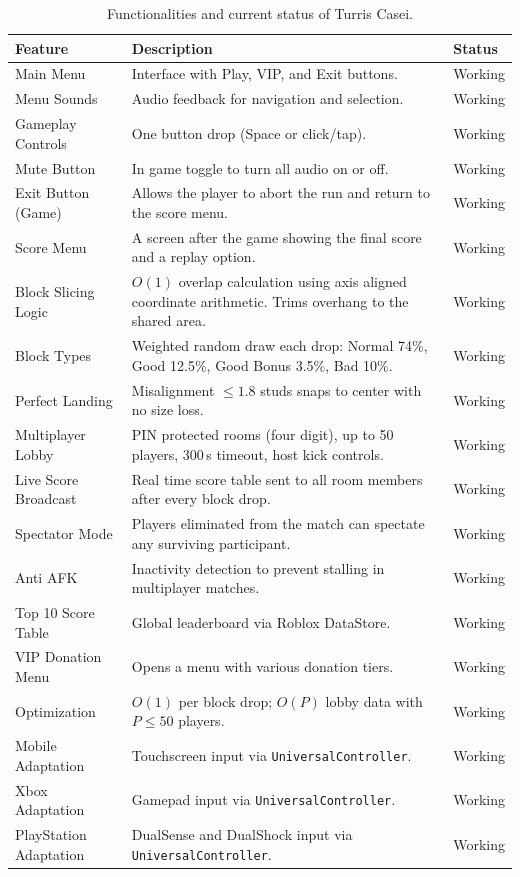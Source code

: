 \documentclass[12pt,letterpaper]{article}
\begin{document}
\begin{table}[H]
\centering
\begin{tabular}{|p{4cm}|p{8cm}|p{2.5cm}|}
\hline
\textbf{Feature} & \textbf{Description} & \textbf{Status} \\
\hline
Main Menu & Interface with Play, VIP, and Exit buttons. & Working \\
\hline
Menu Sounds & Audio feedback for navigation and selection. & Working \\
\hline
Gameplay Controls & One button drop (Space or click/tap). & Working \\
\hline
Mute Button & In game toggle to turn all audio on or off. & Working \\
\hline
Exit Button (Game) & Allows the player to abort the run and return to the score menu. & Working \\
\hline
Score Menu & A screen after the game showing the final score and a replay option. & Working \\
\hline
Block Slicing Logic & $O(1)$ overlap calculation using axis aligned coordinate arithmetic. Trims overhang to the shared area. & Working \\
\hline
Block Types & Weighted random draw each drop: Normal 74\%, Good 12.5\%, Good Bonus 3.5\%, Bad 10\%. & Working \\
\hline
Perfect Landing & Misalignment $\leq 1.8$ studs snaps to center with no size loss. & Working \\
\hline
Multiplayer Lobby & PIN protected rooms (four digit), up to 50 players, 300\,s timeout, host kick controls. & Working \\
\hline
Live Score Broadcast & Real time score table sent to all room members after every block drop. & Working \\
\hline
Spectator Mode & Players eliminated from the match can spectate any surviving participant. & Working \\
\hline
Anti AFK & Inactivity detection to prevent stalling in multiplayer matches. & Working \\
\hline
Top 10 Score Table & Global leaderboard via Roblox DataStore. & Working \\
\hline
VIP Donation Menu & Opens a menu with various donation tiers. & Working \\
\hline
Optimization & $O(1)$ per block drop; $O(P)$ lobby data with $P \leq 50$ players. & Working \\
\hline
Mobile Adaptation & Touchscreen input via \texttt{UniversalController}. & Working \\
\hline
Xbox Adaptation & Gamepad input via \texttt{UniversalController}. & Working \\
\hline
PlayStation Adaptation & DualSense and DualShock input via \texttt{UniversalController}. & Working \\
\hline
\end{tabular}
\caption{Functionalities and current status of Turris Casei.}
\end{table}
\end{document}
